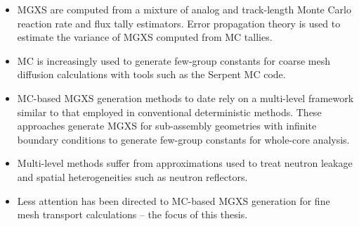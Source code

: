 

\vfill
\begin{highlightsbox}[frametitle=Highlights]
\begin{itemize}
  \item \ac{MGXS} are computed from a mixture of analog and track-length Monte Carlo reaction rate and flux tally estimators. Error propagation theory is used to estimate the variance of \ac{MGXS} computed from \ac{MC} tallies.
  \item \ac{MC} is increasingly used to generate few-group constants for coarse mesh diffusion calculations with tools such as the Serpent \ac{MC} code.
  \item \ac{MC}-based \ac{MGXS} generation methods to date rely on a multi-level framework similar to that employed in conventional deterministic methods. These approaches generate \ac{MGXS} for sub-assembly geometries with infinite boundary conditions to generate few-group constants for whole-core analysis.
  \item Multi-level methods suffer from approximations used to treat neutron leakage and spatial heterogeneities such as neutron reflectors.  
  \item Less attention has been directed to \ac{MC}-based \ac{MGXS} generation for fine mesh transport calculations -- the focus of this thesis.
\end{itemize}
\end{highlightsbox}
\vfill